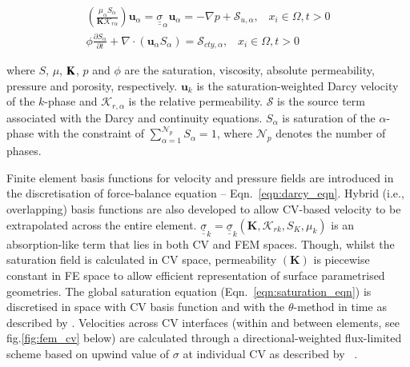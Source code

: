 \documentclass[preprint,authoryear,12pt]{elsarticle}
\begin{document}
\begin{eqnarray}
\left(\displaystyle\frac{\mu_{\alpha}S_{\alpha}}{{\mathbf K}\mathcal{K}_{r\alpha}}\right) {\mathbf u}_{\alpha} = \underline{\underline{\sigma}}_{\alpha} {\mathbf u}_{\alpha} = -\nabla p + \mathcal{S}_{u,\alpha},\;\;\; x_{i}\in\Omega, t>0 \label{eqn:darcy_eqn} \\
\phi\displaystyle\frac{\partial S_{\alpha} }{\partial t} +   \nabla \cdot \left( {\mathbf u}_{\alpha}  S_{\alpha}\right) =  \mathcal{S}_{cty,\alpha},\;\;\; x_{i}\in\Omega, t>0\label{eqn:saturation_eqn}
\end{eqnarray}

where $S$, $\mu$, ${\bf K}$, $p$ and $\phi$ are the saturation, viscosity, absolute permeability, pressure and porosity, respectively. ${\mathbf u}_{k}$ is the saturation-weighted Darcy velocity of the $k$-phase and $\mathcal{K}_{r,\alpha}$ is the relative permeability. $\mathcal{S}$ is the source term associated with the Darcy and continuity equations. $S_{\alpha}$ is saturation of the $\alpha$-phase with the constraint of $\sum\limits_{\alpha=1}^{\mathcal{N}_{p}} S_{\alpha} = 1$, where $\mathcal{N}_{p}$ denotes the number of phases.

\medskip
Finite element basis functions for velocity and pressure fields are introduced in the discretisation of force-balance equation -- Eqn.~\ref{eqn:darcy_eqn}. Hybrid (i.e., overlapping) basis functions are also developed to allow CV-based velocity to be extrapolated across the entire element. $\underline{\underline{\sigma}}_{k}=\underline{\underline{\sigma}}_{k}\left({\mathbf K}, \mathcal{K}_{rk}, S_{K}, \mu_{k}\right)$ is an absorption-like term that lies in both CV and FEM spaces. Though, whilst the saturation field is calculated in CV space, permeability $\left({\mathbf K}\right)$ is piecewise constant in FE space to allow efficient representation of surface parametrised geometries. The global saturation equation (Eqn.~\ref{eqn:saturation_eqn}) is discretised in space with CV basis function and with the $\theta$-method in time as described by \citet{gomes_book_2012}. Velocities across CV interfaces (within and between elements, see fig.\ref{fig:fem_cv} below) are calculated through a directional-weighted flux-limited scheme based on upwind value of $\sigma$ at individual CV as described by \citet{gomes_2013}~\citep[see also][]{jackson_2013}.
\end{document}

